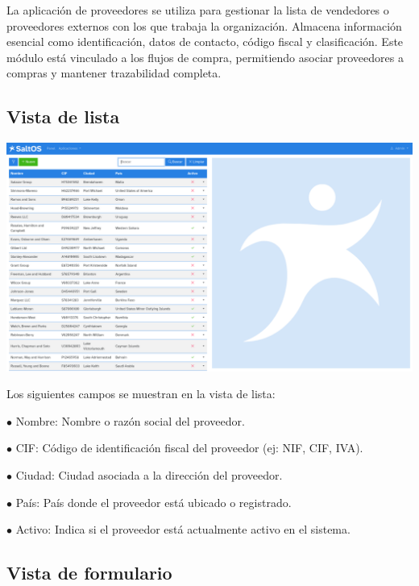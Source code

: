 \documentclass[a4paper]{article}
\begin{document}
La aplicación de proveedores se utiliza para gestionar la lista de vendedores o proveedores externos con los que trabaja la organización.
Almacena información esencial como identificación, datos de contacto, código fiscal y clasificación.
Este módulo está vinculado a los flujos de compra, permitiendo asociar proveedores a compras y mantener trazabilidad completa.

\hypertarget{toc128}{}
\subsection{Vista de lista}

\begin{center}\includegraphics[width=1\textwidth]{../ujest/snaps/test-screenshots-js-screenshots-purchases-suppliers-list-es-es-1-snap.png}\end{center}

Los siguientes campos se muestran en la vista de lista:

\begin{compactitem}
\item[\color{myblue}$\bullet$] Nombre: Nombre o razón social del proveedor.
\item[\color{myblue}$\bullet$] CIF: Código de identificación fiscal del proveedor (ej: NIF, CIF, IVA).
\item[\color{myblue}$\bullet$] Ciudad: Ciudad asociada a la dirección del proveedor.
\item[\color{myblue}$\bullet$] País: País donde el proveedor está ubicado o registrado.
\item[\color{myblue}$\bullet$] Activo: Indica si el proveedor está actualmente activo en el sistema.
\end{compactitem}

\hypertarget{toc129}{}
\subsection{Vista de formulario}
\end{document}
